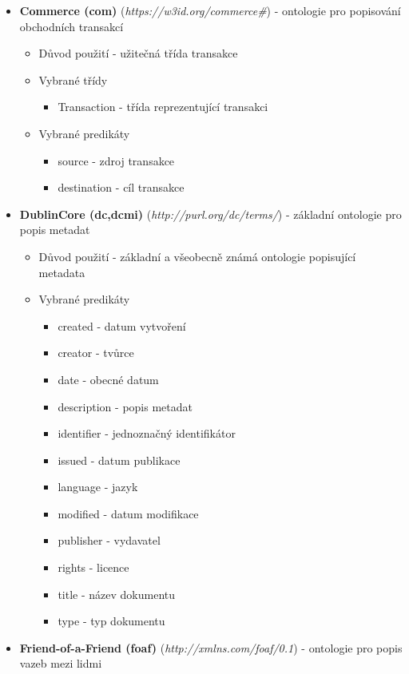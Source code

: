 \begin{itemize}
\item \textbf{Commerce (com)} (\textit{https://w3id.org/commerce\#})\cite{commerce} - ontologie pro popisování obchodních transakcí
	\begin{itemize}
	\item Důvod použití - užitečná třída transakce 
	\item Vybrané třídy 
		\begin{itemize}
		\item Transaction - třída reprezentující transakci 
		\end{itemize}
	\item Vybrané predikáty
		\begin{itemize}
		\item source - zdroj transakce
		\item destination - cíl transakce
		\end{itemize}
	\end{itemize}
\item \textbf{DublinCore (dc,dcmi)} (\textit{http://purl.org/dc/terms/})\cite{dc} - základní ontologie pro popis metadat 
	\begin{itemize}
	\item Důvod použití - základní a všeobecně známá ontologie popisující metadata
	\item Vybrané predikáty
		\begin{itemize}
		\item created - datum vytvoření
		\item creator - tvůrce
		\item date - obecné datum
		\item description - popis metadat
		\item identifier - jednoznačný identifikátor
		\item issued - datum publikace
		\item language - jazyk
		\item modified - datum modifikace
		\item publisher - vydavatel
		\item rights - licence
		\item title - název dokumentu
		\item type - typ dokumentu
		\end{itemize}
	\end{itemize}
\item \textbf{Friend-of-a-Friend (foaf)} (\textit{http://xmlns.com/foaf/0.1})\cite{foaf} - ontologie pro popis vazeb mezi lidmi

\end{itemize}
